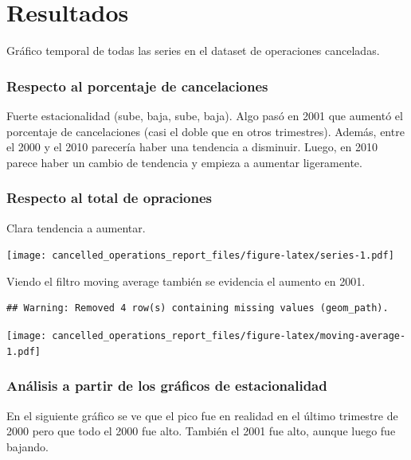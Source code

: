 \documentclass[
]{article}
\begin{document}
\hypertarget{resultados}{%
\section{Resultados}\label{resultados}}

Gráfico temporal de todas las series en el dataset de operaciones
canceladas.

\hypertarget{respecto-al-porcentaje-de-cancelaciones}{%
\subsubsection{Respecto al porcentaje de
cancelaciones}\label{respecto-al-porcentaje-de-cancelaciones}}

Fuerte estacionalidad (sube, baja, sube, baja). Algo pasó en 2001 que
aumentó el porcentaje de cancelaciones (casi el doble que en otros
trimestres). Además, entre el 2000 y el 2010 parecería haber una
tendencia a disminuir. Luego, en 2010 parece haber un cambio de
tendencia y empieza a aumentar ligeramente.

\hypertarget{respecto-al-total-de-opraciones}{%
\subsubsection{Respecto al total de
opraciones}\label{respecto-al-total-de-opraciones}}

Clara tendencia a aumentar.

\texttt{[image: cancelled\_operations\_report\_files/figure-latex/series-1.pdf]}

Viendo el filtro moving average también se evidencia el aumento en 2001.

\begin{verbatim}
## Warning: Removed 4 row(s) containing missing values (geom_path).
\end{verbatim}

\texttt{[image: cancelled\_operations\_report\_files/figure-latex/moving-average-1.pdf]}

\hypertarget{anuxe1lisis-a-partir-de-los-gruxe1ficos-de-estacionalidad}{%
\subsubsection{Análisis a partir de los gráficos de
estacionalidad}\label{anuxe1lisis-a-partir-de-los-gruxe1ficos-de-estacionalidad}}

En el siguiente gráfico se ve que el pico fue en realidad en el último
trimestre de 2000 pero que todo el 2000 fue alto. También el 2001 fue
alto, aunque luego fue bajando.
\end{document}
